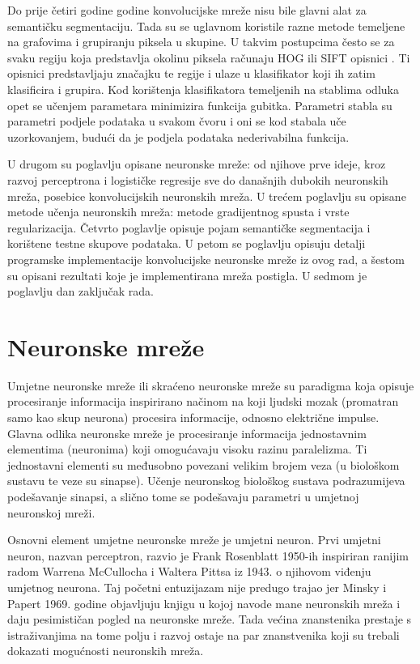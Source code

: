 \documentclass[times, utf8, diplomski, numeric]{fer}
\begin{document}
Do prije četiri godine godine konvolucijske mreže nisu bile glavni alat za semantičku segmentaciju. Tada su se uglavnom koristile razne metode temeljene na grafovima i grupiranju piksela u skupine. U takvim postupcima često se za svaku regiju koja predstavlja okolinu piksela računaju HOG  ili SIFT  opisnici \cite{Lowe:1999}. Ti opisnici predstavljaju značajku te regije i ulaze u klasifikator koji ih zatim klasificira i grupira.
Kod korištenja klasifikatora temeljenih na stablima odluka opet se učenjem parametara minimizira funkcija gubitka. Parametri stabla su parametri podjele podataka u svakom čvoru  i oni se kod stabala uče uzorkovanjem, budući da je podjela podataka nederivabilna funkcija.

U drugom su poglavlju opisane neuronske mreže: od njihove prve ideje, kroz razvoj perceptrona i logističke regresije sve do današnjih dubokih neuronskih mreža, posebice konvolucijskih neuronskih mreža. U trećem poglavlju su opisane metode učenja neuronskih mreža: metode gradijentnog spusta i vrste regularizacija. Četvrto poglavlje opisuje pojam semantičke segmentacija i korištene testne skupove podataka. U petom se poglavlju opisuju detalji programske implementacije konvolucijske neuronske mreže iz ovog rad, a šestom su opisani rezultati koje je implementirana mreža postigla. U sedmom je poglavlju dan zaključak rada.

\chapter{Neuronske mreže}

Umjetne neuronske mreže  ili skraćeno neuronske mreže su paradigma koja opisuje procesiranje informacija inspirirano načinom na koji ljudski mozak (promatran samo kao skup neurona) procesira informacije, odnosno električne impulse. Glavna odlika neuronske mreže je procesiranje informacija jednostavnim elementima (neuronima) koji omogućavaju visoku razinu paralelizma. Ti jednostavni elementi su međusobno povezani velikim brojem veza (u biološkom sustavu te veze su sinapse). Učenje neuronskog biološkog sustava podrazumijeva podešavanje sinapsi, a slično tome se podešavaju parametri u umjetnoj neuronskoj mreži.

Osnovni element umjetne neuronske mreže je umjetni neuron. Prvi umjetni neuron, nazvan perceptron, razvio je Frank Rosenblatt 1950-ih inspiriran ranijim radom \cite{mcculloch43a}  Warrena  McCullocha i Waltera Pittsa iz 1943. o njihovom viđenju umjetnog neurona. Taj početni entuzijazam nije predugo trajao jer Minsky i Papert 1969. godine objavljuju knjigu \cite{minsky69perceptrons} u kojoj navode mane neuronskih mreža i daju pesimističan pogled na neuronske mreže. Tada većina znanstenika prestaje s istraživanjima na tome polju i razvoj ostaje na par znanstvenika koji su trebali dokazati mogućnosti neuronskih mreža.
\end{document}
